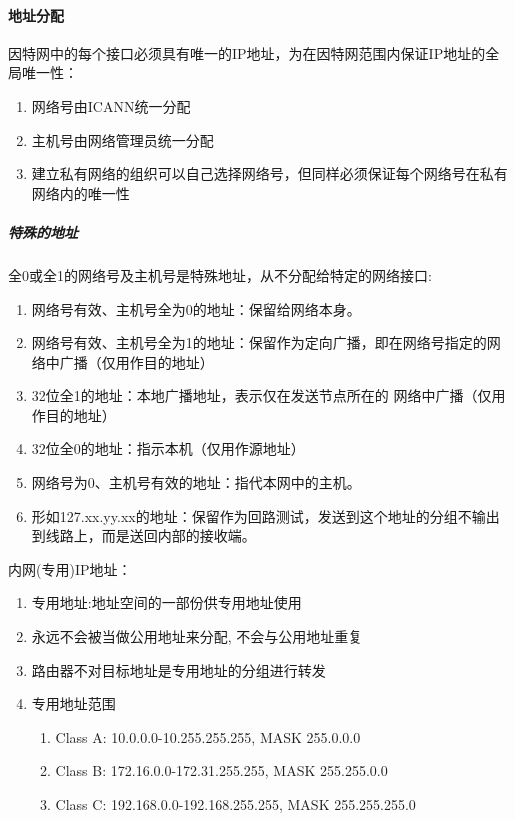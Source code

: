 \documentclass[]{report}
\begin{document}
			\paragraph{地址分配}
			因特网中的每个接口必须具有唯一的IP地址，为在因特网范围内保证IP地址的全局唯一性：
			\begin{enumerate}
				\item 网络号由ICANN统一分配
				\item 主机号由网络管理员统一分配
				\item 建立私有网络的组织可以自己选择网络号，但同样必须保证每个网络号在私有网络内的唯一性
			\end{enumerate}
				\subparagraph{特殊的地址}
				全0或全1的网络号及主机号是特殊地址，从不分配给特定的网络接口:
				\begin{enumerate}
					\item 网络号有效、主机号全为0的地址：保留给网络本身。
					\item 网络号有效、主机号全为1的地址：保留作为定向广播，即在网络号指定的网络中广播（仅用作目的地址）
					\item 32位全1的地址：本地广播地址，表示仅在发送节点所在的 网络中广播（仅用作目的地址）
					\item 32位全0的地址：指示本机（仅用作源地址）
					\item 网络号为0、主机号有效的地址：指代本网中的主机。
					\item 形如127.xx.yy.xx的地址：保留作为回路测试，发送到这个地址的分组不输出到线路上，而是送回内部的接收端。
				\end{enumerate}
				内网(专用)IP地址：
				\begin{enumerate}
					\item 专用地址:地址空间的一部份供专用地址使用
					\item 永远不会被当做公用地址来分配, 不会与公用地址重复
					\item 路由器不对目标地址是专用地址的分组进行转发
					\item 专用地址范围
					\begin{enumerate}
						\item Class A: 10.0.0.0-10.255.255.255, MASK 255.0.0.0
						\item Class B: 172.16.0.0-172.31.255.255, MASK 255.255.0.0
						\item Class C: 192.168.0.0-192.168.255.255, MASK 255.255.255.0
					\end{enumerate}
				\end{enumerate}
\end{document}
